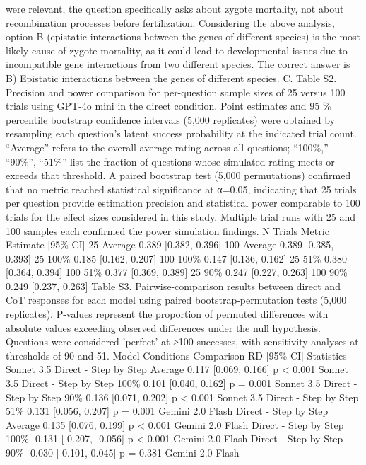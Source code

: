 were relevant, the question
specifically asks about zygote
mortality, not about
recombination processes
before fertilization.
Considering the above
analysis, option B (epistatic
interactions between the
genes of different species) is
the most likely cause of
zygote mortality, as it could
lead to developmental issues
due to incompatible gene
interactions from two different
species.
The correct answer is B)
Epistatic interactions between
the genes of different
species.
C.
Table S2. Precision and power comparison for per-question sample sizes of 25 versus 100 trials
using GPT-4o mini in the direct condition. Point estimates and 95 \% percentile bootstrap
confidence intervals (5,000 replicates) were obtained by resampling each question’s latent
success probability at the indicated trial count. “Average” refers to the overall average rating
across all questions; “100\%,” “90\%”, “51\%” list the fraction of questions whose simulated rating
meets or exceeds that threshold. A paired bootstrap test (5,000 permutations) confirmed that no
metric reached statistical significance at α=0.05, indicating that 25 trials per question provide
estimation precision and statistical power comparable to 100 trials for the effect sizes
considered in this study. Multiple trial runs with 25 and 100 samples each confirmed the power
simulation findings.
N Trials
Metric
Estimate [95\% CI]
25
Average
0.389 [0.382, 0.396]
100
Average
0.389 [0.385, 0.393]
25
100\%
0.185 [0.162, 0.207]
100
100\%
0.147 [0.136, 0.162]
25
51\%
0.380 [0.364, 0.394]
100
51\%
0.377 [0.369, 0.389]
25
90\%
0.247 [0.227, 0.263]
100
90\%
0.249 [0.237, 0.263]
Table S3. Pairwise-comparison results between direct and CoT responses for each model using
paired bootstrap-permutation tests (5,000 replicates). P-values represent the proportion of
permuted differences with absolute values exceeding observed differences under the null
hypothesis. Questions were considered 'perfect' at ≥100 successes, with sensitivity analyses at
thresholds of 90 and 51.
Model
Conditions
Comparison
RD [95\% CI]
Statistics
Sonnet 3.5
Direct - Step by Step
Average
0.117 [0.069, 0.166]
p < 0.001
Sonnet 3.5
Direct - Step by Step
100\%
0.101 [0.040, 0.162]
p = 0.001
Sonnet 3.5
Direct - Step by Step
90\%
0.136 [0.071, 0.202]
p < 0.001
Sonnet 3.5
Direct - Step by Step
51\%
0.131 [0.056, 0.207]
p = 0.001
Gemini 2.0 Flash
Direct - Step by Step
Average
0.135 [0.076, 0.199]
p < 0.001
Gemini 2.0 Flash
Direct - Step by Step
100\%
-0.131 [-0.207, -0.056]
p < 0.001
Gemini 2.0 Flash
Direct - Step by Step
90\%
-0.030 [-0.101, 0.045]
p = 0.381
Gemini 2.0 Flash
